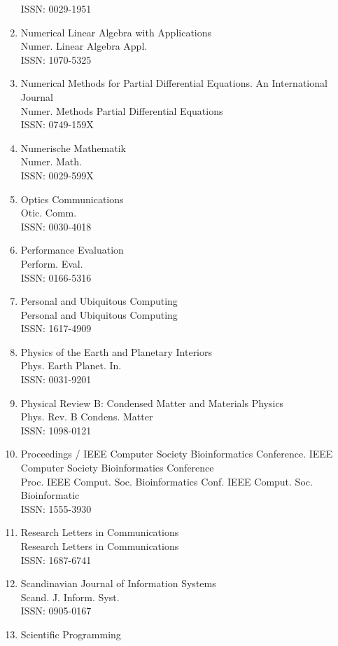 \begin{enumerate}
 ISSN: 0029-1951
\item
 Numerical Linear Algebra with Applications\\
 Numer. Linear Algebra Appl.\\
 ISSN: 1070-5325
\item
 Numerical Methods for Partial Differential Equations. An International Journal\\
 Numer. Methods Partial Differential Equations\\
 ISSN: 0749-159X
\item
 Numerische Mathematik\\
 Numer. Math.\\
 ISSN: 0029-599X
\item
 Optics Communications\\
 Otic. Comm.\\
 ISSN: 0030-4018
\item
 Performance Evaluation\\
 Perform. Eval.\\
 ISSN: 0166-5316
\item
 Personal and Ubiquitous Computing\\
 Personal and Ubiquitous Computing\\
 ISSN: 1617-4909
\item
 Physics of the Earth and Planetary Interiors\\
 Phys. Earth Planet. In.\\
 ISSN: 0031-9201
\item
 Physical Review B: Condensed Matter and Materials Physics\\
 Phys. Rev. B Condens. Matter\\
 ISSN: 1098-0121
\item
 Proceedings / IEEE Computer Society Bioinformatics Conference. IEEE Computer Society Bioinformatics Conference\\
 Proc. IEEE Comput. Soc. Bioinformatics Conf. IEEE Comput. Soc. Bioinformatic\\
 ISSN: 1555-3930
\item
 Research Letters in Communications\\
 Research Letters in Communications\\
 ISSN: 1687-6741
\item
 Scandinavian Journal of Information Systems\\
 Scand. J. Inform. Syst.\\
 ISSN: 0905-0167
\item
 Scientific Programming\\

\end{enumerate}
